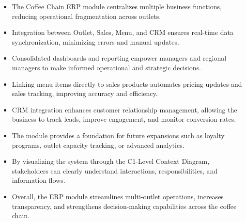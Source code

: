 \begin{itemize}
    \item The Coffee Chain ERP module centralizes multiple business functions, reducing operational fragmentation across outlets.
    \item Integration between Outlet, Sales, Menu, and CRM ensures real-time data synchronization, minimizing errors and manual updates.
    \item Consolidated dashboards and reporting empower managers and regional managers to make informed operational and strategic decisions.
    \item Linking menu items directly to sales products automates pricing updates and sales tracking, improving accuracy and efficiency.
    \item CRM integration enhances customer relationship management, allowing the business to track leads, improve engagement, and monitor conversion rates.
    \item The module provides a foundation for future expansions such as loyalty programs, outlet capacity tracking, or advanced analytics.
    \item By visualizing the system through the C1-Level Context Diagram, stakeholders can clearly understand interactions, responsibilities, and information flows.
    \item Overall, the ERP module streamlines multi-outlet operations, increases transparency, and strengthens decision-making capabilities across the coffee chain.
\end{itemize}
